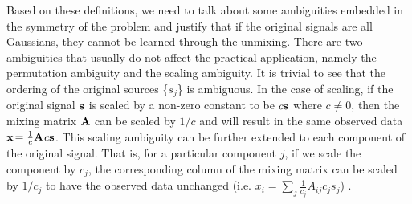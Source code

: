 \documentclass[aps,prl,preprint,superscriptaddress]{revtex4-2}
\begin{document}
Based on these definitions, we need to talk about some ambiguities embedded in the symmetry of the problem and justify that if the original signals are all Gaussians, they cannot be learned through the unmixing. There are two ambiguities that usually do not affect the practical application, namely the permutation ambiguity and the scaling ambiguity. It is trivial to see that the ordering of the original sources \{$s_{j}$\} is ambiguous.
In the case of scaling, if the original signal $\bf{s}$ is scaled by a non-zero constant to be $c\bf{s}$ where $c \neq 0$, then the mixing matrix $\bf{A}$ can be scaled by $1/c$ and will result in the same observed data $\bf{x}$$ = \frac{1}{c}\bf{A}$$c\bf{s}$. This scaling ambiguity can be further extended to each component of the original signal.
That is, for a particular component $j$, if we scale the component by $c_{j}$, the corresponding column of the mixing matrix can be scaled by $1/c_{j}$ to have the observed data unchanged (i.e. $x_{i} = \sum_{j}\frac{1}{c_{j}}A_{ij}c_{j}s_{j}$) \cite{ng_cs229}.
\end{document}
